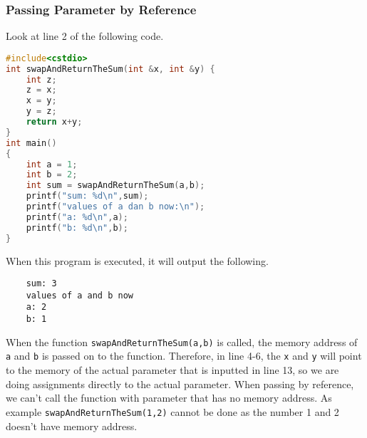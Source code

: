 \subsubsection{Passing Parameter by Reference}
Look at line 2 of the following code.
\begin{lstlisting}[language=c,caption = Passing by Reference,label=lst:passbyreference01]
#include<cstdio>
int swapAndReturnTheSum(int &x, int &y) {
    int z;
    z = x;
    x = y;
    y = z;
    return x+y;
}
int main()
{
    int a = 1;
    int b = 2;
    int sum = swapAndReturnTheSum(a,b);
    printf("sum: %d\n",sum);
    printf("values of a dan b now:\n");
    printf("a: %d\n",a);
    printf("b: %d\n",b);
}
\end{lstlisting}
When this program is executed, it will output the following.
\begin{verbatim}
    sum: 3
    values of a and b now
    a: 2
    b: 1
\end{verbatim}

When the function \verb|swapAndReturnTheSum(a,b)| is called, the memory address of \verb|a| and \verb|b| is passed on to the function. Therefore, in line 4-6, the \verb|x| and \verb|y| will point to the memory of the actual parameter that is inputted in line 13, so we are doing assignments directly to the actual parameter. When passing by reference, we can't call the function with parameter that has no memory address. As example \verb|swapAndReturnTheSum(1,2)| cannot be done as the number 1 and 2 doesn't have memory address.

